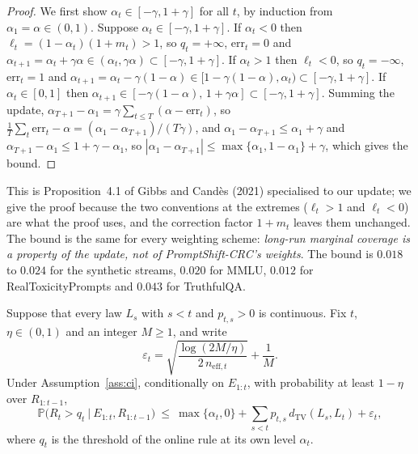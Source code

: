 \begin{proof}
We first show $\alpha_t\in[-\gamma,1+\gamma]$ for all $t$, by induction from $\alpha_1=\alpha\in(0,1)$.
Suppose $\alpha_t\in[-\gamma,1+\gamma]$.
If $\alpha_t<0$ then $\ell_t=(1-\alpha_t)(1+m_t)>1$, so $q_t=+\infty$, $\mathrm{err}_t=0$ and
$\alpha_{t+1}=\alpha_t+\gamma\alpha\in(\alpha_t,\gamma\alpha)\subset[-\gamma,1+\gamma]$.
If $\alpha_t>1$ then $\ell_t<0$, so $q_t=-\infty$, $\mathrm{err}_t=1$ and
$\alpha_{t+1}=\alpha_t-\gamma(1-\alpha)\in[1-\gamma(1-\alpha),\alpha_t)\subset[-\gamma,1+\gamma]$.
If $\alpha_t\in[0,1]$ then $\alpha_{t+1}\in[-\gamma(1-\alpha),\,1+\gamma\alpha]\subset[-\gamma,1+\gamma]$.
Summing the update, $\alpha_{T+1}-\alpha_1=\gamma\sum_{t\le T}(\alpha-\mathrm{err}_t)$, so
$\frac1T\sum_t\mathrm{err}_t-\alpha=(\alpha_1-\alpha_{T+1})/(T\gamma)$, and
$\alpha_1-\alpha_{T+1}\le\alpha_1+\gamma$ and $\alpha_{T+1}-\alpha_1\le 1+\gamma-\alpha_1$, so
$|\alpha_1-\alpha_{T+1}|\le\max\{\alpha_1,1-\alpha_1\}+\gamma$, which gives the bound.
\end{proof}

This is Proposition~4.1 of Gibbs and Cand\`es (2021) specialised to our update; we give the proof because the
two conventions at the extremes ($\ell_t>1$ and $\ell_t<0$) are what the proof uses, and the correction factor
$1+m_t$ leaves them unchanged. The bound is the same for every weighting scheme: \emph{long-run marginal
coverage is a property of the update, not of PromptShift-CRC's weights}. The bound is $0.018$ to $0.024$ for the synthetic streams, $0.020$ for MMLU, $0.012$ for RealToxicityPrompts and $0.043$ for TruthfulQA.

\begin{proposition}\label{prop:running}
Suppose that every law $L_s$ with $s<t$ and $p_{t,s}>0$ is continuous. Fix $t$, $\eta\in(0,1)$ and an integer $M\ge 1$, and write
\[
 \varepsilon_t=\sqrt{\frac{\log(2M/\eta)}{2\,n_{\mathrm{eff},t}}}+\frac1M .
\]
Under Assumption~\ref{ass:ci}, conditionally on $E_{1:t}$, with probability at least $1-\eta$ over $R_{1:t-1}$,
\[
 \mathbb P\bigl(R_t>q_t\ \big|\ E_{1:t},R_{1:t-1}\bigr)\ \le\ \max\{\alpha_t,0\}+\sum_{s<t}p_{t,s}\,d_{\mathrm{TV}}(L_s,L_t)+\varepsilon_t ,
\]
where $q_t$ is the threshold of the online rule at its own level $\alpha_t$.
\end{proposition}

